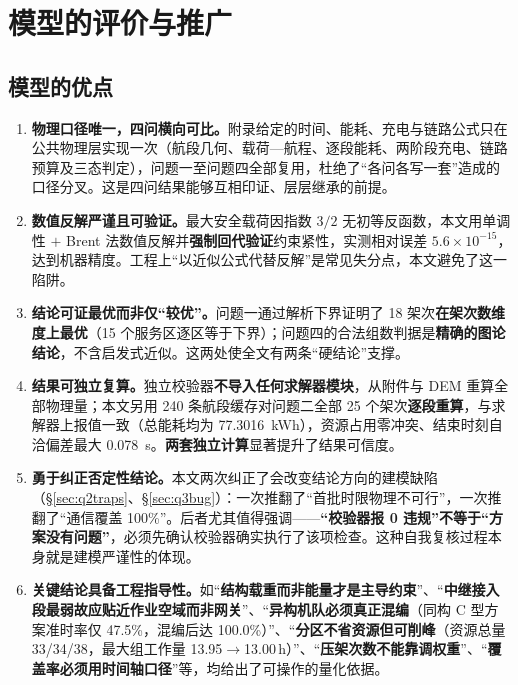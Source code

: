 \section{模型的评价与推广}

\subsection{模型的优点}

\begin{enumerate}[label=\textbf{优点 \arabic*}]
	\item \textbf{物理口径唯一，四问横向可比。}附录给定的时间、能耗、充电与链路公式只在公共物理层实现一次（航段几何、载荷—航程、逐段能耗、两阶段充电、链路预算及三态判定），问题一至问题四全部复用，杜绝了“各问各写一套”造成的口径分叉。这是四问结果能够互相印证、层层继承的前提。

	\item \textbf{数值反解严谨且可验证。}最大安全载荷因指数 $3/2$ 无初等反函数，本文用单调性 $+$ Brent 法数值反解并\textbf{强制回代验证}约束紧性，实测相对误差 $5.6\times10^{-15}$，达到机器精度。工程上“以近似公式代替反解”是常见失分点，本文避免了这一陷阱。

	\item \textbf{结论可证最优而非仅“较优”。}问题一通过解析下界证明了 18 架次\textbf{在架次数维度上最优}（15 个服务区逐区等于下界）；问题四的合法组数判据是\textbf{精确的图论结论}，不含启发式近似。这两处使全文有两条“硬结论”支撑。

	\item \textbf{结果可独立复算。}独立校验器\textbf{不导入任何求解器模块}，从附件与 DEM 重算全部物理量；本文另用 240 条航段缓存对问题二全部 25 个架次\textbf{逐段重算}，与求解器上报值一致（总能耗均为 \SI{77.3016}{kWh}），资源占用零冲突、结束时刻自洽偏差最大 \SI{0.078}{s}。\textbf{两套独立计算}显著提升了结果可信度。

	\item \textbf{勇于纠正否定性结论。}本文两次纠正了会改变结论方向的建模缺陷（\S\ref{sec:q2traps}、\S\ref{sec:q3bug}）：一次推翻了“首批时限物理不可行”，一次推翻了“通信覆盖 100\%”。后者尤其值得强调——\textbf{“校验器报 0 违规”不等于“方案没有问题”}，必须先确认校验器确实执行了该项检查。这种自我复核过程本身就是建模严谨性的体现。

	\item \textbf{关键结论具备工程指导性。}如“\textbf{结构载重而非能量才是主导约束}”、“\textbf{中继接入段最弱故应贴近作业空域而非网关}”、“\textbf{异构机队必须真正混编}（同构 C 型方案准时率仅 47.5\%，混编后达 100.0\%）”、“\textbf{分区不省资源但可削峰}（资源总量 33/34/38，最大组工作量 13.95$\to$13.00\,h）”、“\textbf{压架次数不能靠调权重}”、“\textbf{覆盖率必须用时间轴口径}”等，均给出了可操作的量化依据。
\end{enumerate}


